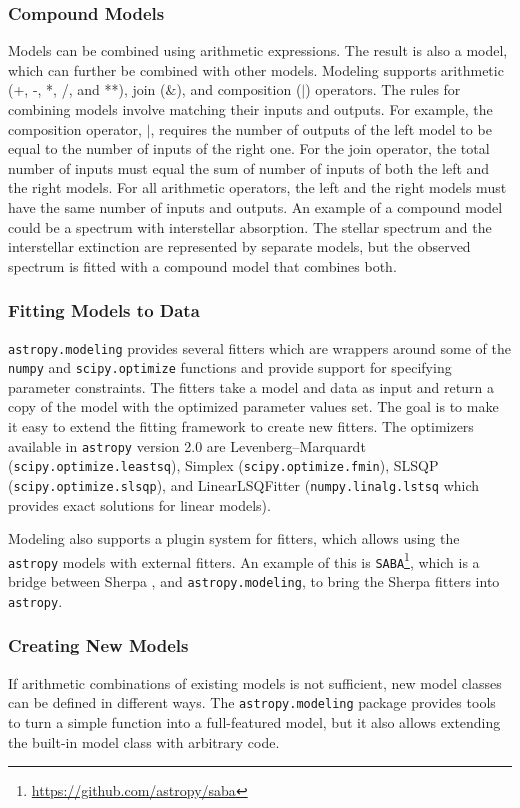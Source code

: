 \documentclass[modern]{aastex61}
\newcommand{\package}[1]{\texttt{#1}\xspace}
\newcommand{\astropypkg}{\package{astropy}}
\begin{document}
\subsubsection{Compound Models}
Models can be combined using arithmetic expressions. The result is also a model, which can further be combined with other models. Modeling supports arithmetic (+, -, *, /, and **), join ($\&$), and composition ($|$) operators. The rules for combining models involve matching their inputs and outputs. For example, the composition operator, $|$, requires the number of outputs of the left model to be equal to the number of inputs of the right one. For the join operator, the total number of inputs must equal the sum of number of inputs of both the left and the right models. For all arithmetic operators, the left and the right models must have the same number of inputs and outputs. An example of a compound model could be a spectrum with interstellar absorption. The stellar spectrum and the interstellar extinction are represented by separate models, but the observed spectrum is fitted with a compound model that combines both.

\subsubsection{Fitting Models to Data}

\package{astropy.modeling} provides several fitters which are wrappers around some of the \texttt{numpy} and \texttt{scipy.optimize} functions and provide support for specifying parameter constraints. The fitters take a model and data as input and return a copy of the model with the optimized parameter values set. The goal is to make it easy to extend the fitting framework to create new fitters. The optimizers available in \astropypkg version 2.0 are Levenberg--Marquardt (\texttt{scipy.optimize.leastsq}), Simplex (\texttt{scipy.optimize.fmin}), SLSQP (\texttt{scipy.optimize.slsqp}), and LinearLSQFitter (\texttt{numpy.linalg.lstsq} which provides exact solutions for linear models).

Modeling also supports a plugin system for fitters, which allows using the
\astropypkg models with external fitters. An example of this is
\package{SABA}\footnote{\url{https://github.com/astropy/saba}}, which is a bridge between
Sherpa \citep{sherpa},
and \package{astropy.modeling}, to bring the Sherpa fitters into \astropypkg.

\subsubsection{Creating New Models}
If arithmetic combinations of existing models is not sufficient, new model
classes can be defined in different ways. The \package{astropy.modeling}
package provides tools to turn a simple function into a full-featured model,
but it also allows extending the built-in model class with arbitrary code.
\end{document}
